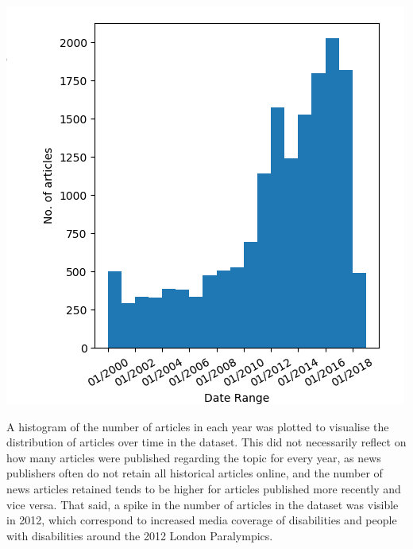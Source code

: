 \documentclass{report}
\begin{document}
\begin{center}
	\includegraphics[width=0.5\linewidth]{row-1-col-3.png}
\end{center}

A histogram of the number of articles in each year was plotted to visualise the distribution of articles over time in the dataset. 
This did not necessarily reflect on how many articles were published regarding the topic for every year, as news publishers often do not retain all historical articles online, and the number of news articles retained tends to be higher for articles published more recently and vice versa.
That said, a spike in the number of articles in the dataset was visible in 2012, which correspond to increased media coverage of disabilities and people with disabilities around the 2012 London Paralympics.
\end{document}
